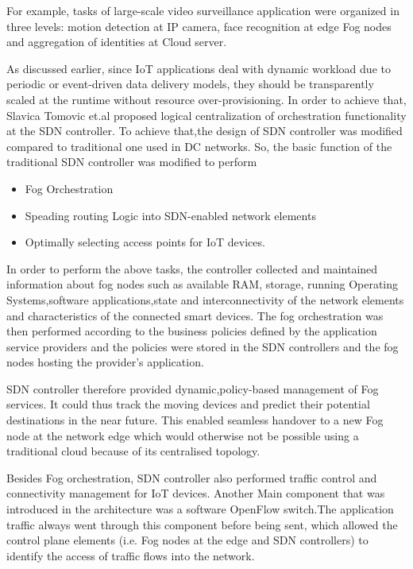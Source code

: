\documentclass{article}
\begin{document}
For example, tasks of large-scale video surveillance application were organized in three levels: motion detection at IP camera, face recognition at edge Fog nodes and aggregation of identities at Cloud server\cite{tomovic2017software}.

As discussed earlier, since IoT applications deal with dynamic workload due to periodic or event-driven data delivery models, they should be transparently scaled at the runtime without resource over-provisioning. In order to achieve that, Slavica Tomovic et.al\cite{tomovic2017software} proposed logical centralization of orchestration functionality at the SDN controller.
To achieve that,the design of SDN controller was modified compared to traditional one used in DC networks\cite{tomovic2017software}.
So, the basic function of the traditional SDN controller was modified to perform
\begin{itemize}
\item Fog Orchestration 
\item Speading routing Logic into SDN-enabled network elements
\item Optimally selecting access points for IoT devices.
\end{itemize}  
In order to perform the above tasks, the controller collected and maintained information about fog nodes such as available RAM, storage, running Operating Systems,software applications,state and interconnectivity of the network elements and characteristics of the connected smart devices.
The fog orchestration was then performed according to the business policies defined by the application service providers and the policies were stored in the SDN controllers and the fog nodes hosting the provider's application\cite{tomovic2017software}.

SDN controller therefore provided dynamic,policy-based management of Fog services. It could thus track the moving devices and predict their potential destinations in the near future. This enabled seamless handover to a new Fog node at the network edge \cite{tomovic2017software}which would otherwise not be possible using a traditional cloud because of its centralised topology.

Besides Fog orchestration, SDN controller also performed traffic control and connectivity management for IoT devices.
Another Main component that was introduced in the architecture was a software OpenFlow switch.The application traffic always went
through this component before being sent, which allowed the control plane elements (i.e. Fog nodes at the edge and SDN controllers) to identify the access of traffic flows into the network\cite{tomovic2017software}. 
\end{document}
